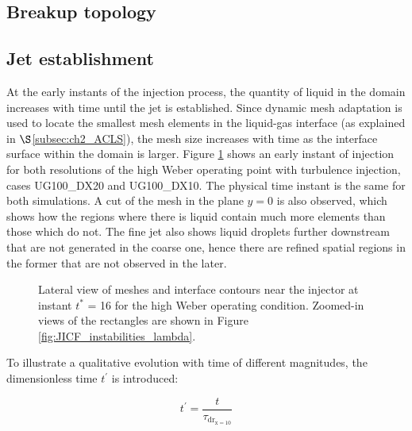 \clearpage

\subsection{Breakup topology}


\subsection{Jet establishment}

At the early instants of the injection process, the quantity of liquid in the domain increases with time until the jet is established. Since dynamic mesh adaptation is used to locate the smallest mesh elements in the liquid-gas interface (as explained in $\S$\ref{subsec:ch2_ACLS}), the mesh size increases with time as the interface surface within the domain is larger. Figure \ref{fig:JICF_w_mesh} shows an early instant of injection for both resolutions of the high Weber operating point with turbulence injection, cases UG100\_DX20 and UG100\_DX10. The physical time instant is the same for both simulations. A cut of the mesh in the plane $y = 0$ is also observed, which shows how the regions where there is liquid contain much more elements than those which do not. The fine jet also shows liquid droplets further downstream that are not generated in the coarse one, hence there are refined spatial regions in the former that are not observed in the later.

\begin{figure}[ht]
\centering
	\centering
\caption[Lateral view of meshes and interface contours near the injector at instant $t^{*}$ = 15 for the high Weber operating condition.]{Lateral view of meshes and interface contours near the injector at instant $t^{*}$ = 16 for the high Weber operating condition. Zoomed-in views of the rectangles are shown in Figure \ref{fig:JICF_instabilities_lambda}.}
\label{fig:JICF_w_mesh}
\end{figure}

To illustrate a qualitative evolution with time of different magnitudes, the dimensionless time $t^{\prime} $ is introduced:

\begin{equation}
\label{eq:t_prime_with_tau_drx10}
t^{\prime} = \frac{t}{\tau_\mathrm{dr_{x=10}}}
\end{equation}

